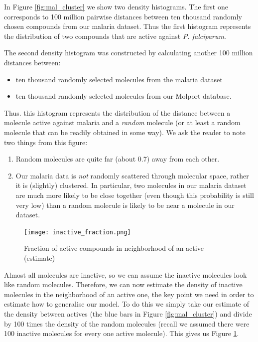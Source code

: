 \documentclass{article}
\begin{document}
In Figure \ref{fig:mal_cluster} we show two density histograms. 
The first one corresponds to 100 million pairwise distances between ten thousand randomly chosen compounds from our malaria dataset.  Thus the first histogram represents the distribution of two compounds that are active against {\it P. falciparum}.

The second density histogram was constructed by calculating another 100 million distances between:
\begin{itemize}
    \item ten thousand randomly selected molecules from the malaria dataset
    \item ten thousand randomly selected molecules from our Molport database.
\end{itemize}
Thus. this histogram represents the distribution of the distance between a molecule active against malaria and a \textit{random} molecule (or at least a random molecule that can be readily obtained in some way).
\newline
\newline
We ask the reader to note two things from this figure:
\begin{enumerate}
    \item Random molecules are quite far (about 0.7) away from each other.
    \item Our malaria data is \textit{not} randomly scattered through molecular space, rather it is (slightly) clustered.  In particular, two molecules in our malaria dataset are much more likely to be close together (even though this probability is still very low) than a random molecule is likely to be near a molecule in our dataset.
\end{enumerate}

\begin{figure}
    \centering
    \texttt{[image: inactive\_fraction.png]}
    \caption{Fraction of active compounds in neighborhood of an active (estimate)}
    \label{fig:inactive_frac}
\end{figure}

Almost all molecules are inactive, so we can assume the inactive molecules look like random molecules.  Therefore, we can now estimate the density of inactive molecules in the neighborhood of an active one, the key point we need in order to estimate how to generalise our model.  To do this we simply take our estimate of the density between actives (the blue bars in Figure \ref{fig:mal_cluster}) and divide by 100 times the density of the random molecules (recall we assumed there were 100 inactive molecules for every one active molecule).  This gives us Figure \ref{fig:inactive_frac}.
\end{document}
